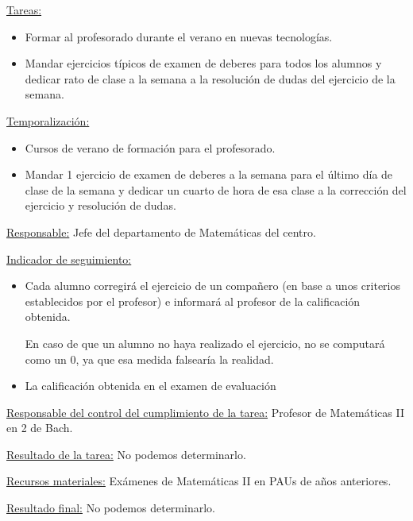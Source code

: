 {\begin{itemize}
\end{itemize}

\ul{Tareas:}
\vspace{-0.3cm}
\begin{itemize}
	\item Formar al profesorado durante el verano en nuevas tecnologías.

	\item Mandar ejercicios típicos de examen de deberes para todos los alumnos y dedicar rato de clase a la semana a la resolución de dudas del ejercicio de la semana.

\end{itemize}


\ul{Temporalizaci\'on:}
\vspace{-0.3cm}
\begin{itemize}
	\item Cursos de verano de formación para el profesorado.

	\item Mandar 1 ejercicio de examen de deberes a la semana para el último día de clase de la semana y dedicar un cuarto de hora de esa clase a la corrección del ejercicio y resolución de dudas.

\end{itemize}

\ul{Responsable:}
Jefe del departamento de Matemáticas del centro.


\ul{Indicador de seguimiento:}
\vspace{-0.3cm}
\begin{itemize}
	\item Cada alumno corregirá el ejercicio de un compañero (en base a unos criterios establecidos por el profesor) e informará al profesor de la calificación obtenida.

	\subitem En caso de que un alumno no haya realizado el ejercicio, no se computará como un 0, ya que esa medida falsearía la realidad.

	\item La calificación obtenida en el examen de evaluación 
\end{itemize}

\ul{Responsable del control del cumplimiento de la tarea:}
Profesor de Matemáticas II en 2 de Bach.


\ul{Resultado de la tarea:}
No podemos determinarlo.


\ul{Recursos materiales:}
Exámenes de Matemáticas II en PAUs de años anteriores.


\ul{Resultado final:}
No podemos determinarlo.



}
